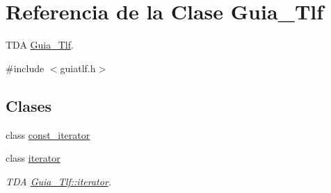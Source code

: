 \hypertarget{classGuia__Tlf}{}\section{Referencia de la Clase Guia\+\_\+\+Tlf}
\label{classGuia__Tlf}


T\+DA \hyperlink{classGuia__Tlf}{Guia\+\_\+\+Tlf}.  




{\ttfamily \#include $<$guiatlf.\+h$>$}

\subsection*{Clases}
\begin{DoxyCompactItemize}
\item 
class \hyperlink{classGuia__Tlf_1_1const__iterator}{const\+\_\+iterator}
\item 
class \hyperlink{classGuia__Tlf_1_1iterator}{iterator}
\begin{DoxyCompactList}\small\item\em T\+DA \hyperlink{classGuia__Tlf_1_1iterator}{Guia\+\_\+\+Tlf\+::iterator}. \end{DoxyCompactList}\end{DoxyCompactItemize}

